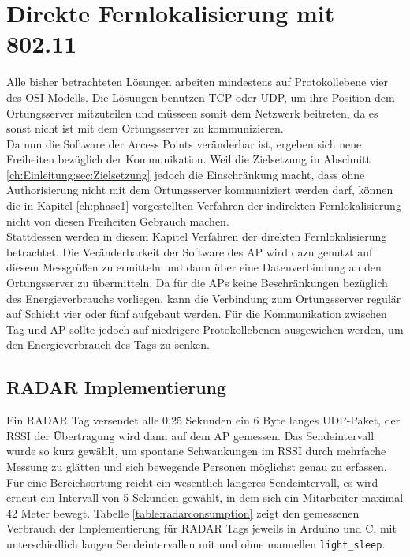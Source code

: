 \chapter{Direkte Fernlokalisierung mit 802.11}
\label{ch:phase2}
Alle bisher betrachteten Lösungen arbeiten mindestens auf Protokollebene vier des OSI-Modells.
Die Lösungen benutzen TCP oder UDP, um ihre Position dem Ortungsserver mitzuteilen und müsseen somit dem Netzwerk beitreten, da es sonst nicht ist mit dem Ortungsserver zu kommunizieren.\\
Da nun die Software der Access Points veränderbar ist, ergeben sich neue Freiheiten bezüglich der Kommunikation.
Weil die Zielsetzung in Abschnitt \ref{ch:Einleitung:sec:Zielsetzung} jedoch die Einschränkung macht, dass ohne Authorisierung nicht mit dem Ortungsserver kommuniziert werden darf, können die in Kapitel \ref{ch:phase1} vorgestellten Verfahren der indirekten Fernlokalisierung nicht von diesen Freiheiten Gebrauch machen.\\
Stattdessen werden in diesem Kapitel Verfahren der direkten Fernlokalisierung betrachtet.
Die Veränderbarkeit der Software des AP wird dazu genutzt auf diesem Messgrößen zu ermitteln und dann über eine Datenverbindung an den Ortungsserver zu übermitteln.
Da für die APs keine Beschränkungen bezüglich des Energieverbrauchs vorliegen, kann die Verbindung zum Ortungsserver regulär auf Schicht vier oder fünf aufgebaut werden.
Für die Kommunikation zwischen Tag und AP sollte jedoch auf niedrigere Protokollebenen ausgewichen werden, um den Energieverbrauch des Tags zu senken. \\


\section{RADAR Implementierung}
Ein RADAR Tag versendet alle 0,25 Sekunden ein 6 Byte langes UDP-Paket, der RSSI der Übertragung wird dann auf dem AP gemessen.
Das Sendeintervall wurde so kurz gewählt, um spontane Schwankungen im RSSI durch mehrfache Messung zu glätten und sich bewegende Personen möglichst genau zu erfassen.
Für eine Bereichsortung reicht ein wesentlich längeres Sendeintervall, es wird erneut ein Intervall von 5 Sekunden gewählt, in dem sich ein Mitarbeiter maximal 42 Meter bewegt. 
Tabelle \ref{table:radarconsumption} zeigt den gemessenen Verbrauch der Implementierung für RADAR Tags jeweils in Arduino und C, mit unterschiedlich langen Sendeintervallen mit und ohne manuellen \texttt{light\_sleep}.

